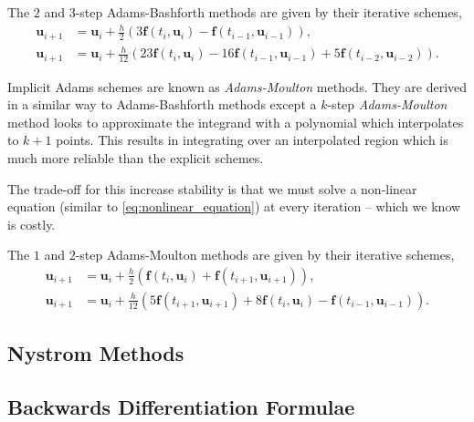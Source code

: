 \documentclass[12pt, twoside]{report}
\theoremstyle{plain}
\theoremstyle{definition}
\theoremstyle{definition}
\begin{document}
            The $2$ and $3$-step Adams-Bashforth methods are given by their 
            iterative schemes,
            \begin{align}
                \mathbf{u}_{i+1} &= \mathbf{u}_{i} + \frac{h}{2} 
                (3\mathbf{f}(t_i, \mathbf{u}_i) - 
                \mathbf{f}(t_{i-1},\mathbf{u}_{i-1})),\\
                \mathbf{u}_{i+1} &= \mathbf{u}_{i} + \frac{h}{12} 
                (23\mathbf{f}(t_i, \mathbf{u}_i) - 
                16\mathbf{f}(t_{i-1},\mathbf{u}_{i-1}) + 
                5\mathbf{f}(t_{i-2}, \mathbf{u}_{i-2})).
            \end{align}

            Implicit Adams schemes are known as \textit{Adams-Moulton} 
            methods. They are derived in a similar way to Adams-Bashforth 
            methods except a $k$-step \textit{Adams-Moulton} method looks to 
            approximate the integrand with a polynomial which interpolates to 
            $k+1$ points. This results in integrating over an interpolated 
            region which is much more reliable than the explicit schemes. 

            The trade-off for this increase stability is that we must solve
            a non-linear equation (similar to \eqref{eq:nonlinear_equation}) at
            every iteration -- which we know is costly.

            The $1$ and $2$-step Adams-Moulton methods are given by their iterative schemes,
            \begin{align}
                \mathbf{u}_{i+1} &= \mathbf{u}_{i} + \frac{h}{2} 
                (\mathbf{f}(t_i, \mathbf{u}_i) + 
                \mathbf{f}(t_{i+1},\mathbf{u}_{i+1})),\\

                \mathbf{u}_{i+1} &= \mathbf{u}_{i} + \frac{h}{12} 
                (5\mathbf{f}(t_{i+1}, \mathbf{u}_{i+1}) +
                8\mathbf{f}(t_{i},\mathbf{u}_{i}) -
                \mathbf{f}(t_{i-1}, \mathbf{u}_{i-1})).
            \end{align}


        \subsection{Nystrom Methods}
        \label{2_nystrom}

        \subsection{Backwards Differentiation Formulae}
        \label{2_bdf}
\end{document}
